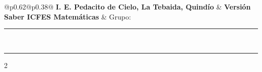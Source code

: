 \documentclass[10pt]{article}
\makeatletter
\newcommand{\myID}{\@ID}
\newcommand{\myDate}{\@Date}
\makeatother
\begin{document}
{\sffamily
\noindent\begin{tabular}{@{}p{}@{}p{}@{}}
\textbf{I. E. Pedacito de Cielo, La Tebaida, Quindío} & \hfill\textbf{Versión \myID}\\
\textbf{Saber ICFES Matemáticas} \textperiodcentered{} \myDate & \hfill Grupo: \rule{2.5cm}{0.3pt}\\[3mm]
\end{tabular}\par\medskip\hrule\medskip}

\begin{multicols}{2}
\begin{enumerate}


\end{enumerate}
\end{multicols}

\clearpage
\ifodd\value{page}\else\thispagestyle{empty}\null\clearpage\fi
\end{document}
